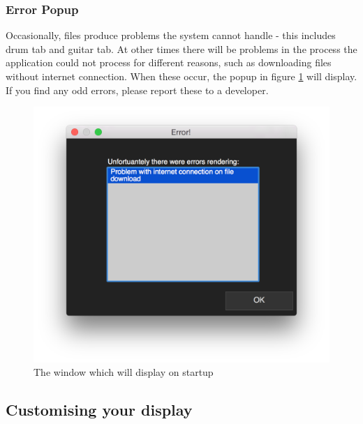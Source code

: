 \subsubsection{Error Popup}
Occasionally, files produce problems the system cannot handle - this includes drum tab and guitar tab. At other times there will be problems in the process the application could not process for different reasons, such as downloading files without internet connection. When these occur, the popup in figure \ref{fig:error} will display. If you find any odd errors, please report these to a developer.
\begin{figure}[H]
\centering
\includegraphics[width=500pt]{errorpop}
\caption{The window which will display on startup}
\label{fig:error}	
\end{figure}

\subsection{Customising your display}
